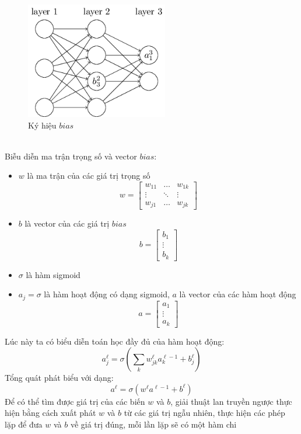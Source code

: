 \begin{figure}[h!]
\centering
\includegraphics[height=2in, keepaspectratio=true]{exb.png}
\caption{Ký hiệu $bias$}
\end{figure}\\
Biễu diễn ma trận trọng số và vector $bias$:
\begin{itemize}
\item $w$ là ma trận của các giá trị trọng số\\ 
\[ w =
\begin{bmatrix}
w_{11} & \ldots & w_{1k} \\
\vdots & \ddots & \vdots\\
w_{j1} & \ldots & w_{jk}
\end{bmatrix}
\]
\item $b$ là vector của các giá trị $bias$\\ 
\[ b =
\begin{bmatrix}
b_1\\
\vdots\\
b_k
\end{bmatrix}
\]
\item $\sigma$ là hàm sigmoid
\item $a_j=\sigma$ là hàm hoạt động có dạng sigmoid, $a$ là vector của các hàm 
hoạt động\\
\[ a =
\begin{bmatrix}
a_1\\
\vdots\\
a_k
\end{bmatrix}
\]
\end{itemize}
Lúc này ta có biểu diễn toán học đầy đủ của hàm hoạt động:\\
\[
  a_j^\ell=\sigma(\sum_k w_{jk}^\ell a_k^{\ell-1} + b_j^\ell)
\]
Tổng quát phát biểu với dạng:\\
\[
  a^\ell=\sigma(w^\ell a^{\ell-1} + b^\ell)
\]
Để có thể tìm được giá trị của các biến $w$ và $b$, giải thuật lan truyền ngược 
thực hiện bằng cách xuất phát $w$ và $b$ từ các giá trị ngẫu nhiên, thực hiện 
các phép lặp để đưa $w$ và $b$ về giá trị đúng, mỗi lần lặp sẽ có một hàm chi 
